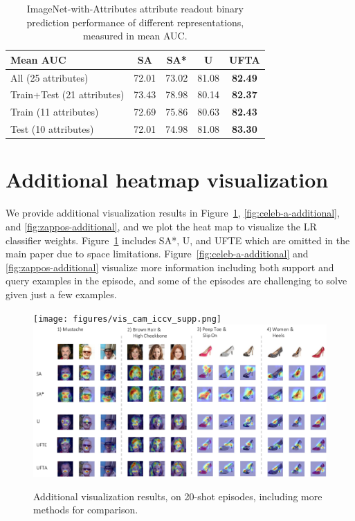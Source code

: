 \begin{table}
\begin{small}
\begin{center}
\begin{tabular}{lcccc}
\toprule
{\bf Mean AUC}             & {\bf SA}  & {\bf SA*}  & {\bf U}   & {\bf UFTA}   \\
\hline

\hline
 All (25 attributes)        & 72.01 & 73.02 & 81.08 & \textbf{82.49} \\
 Train+Test (21 attributes) & 73.43 & 78.98 & 80.14 & \textbf{82.37} \\
 Train (11 attributes)      & 72.69 & 75.86 & 80.63 & \textbf{82.43} \\
 Test (10 attributes)       & 72.01 & 74.98 & 81.08 & \textbf{83.30} \\
\hline
\end{tabular}
\end{center}
\end{small}
\caption{ImageNet-with-Attributes attribute readout binary prediction
performance of different representations, measured in mean AUC. }
\label{tab:attrreadout-imageneta}
\end{table}

\section{Additional heatmap visualization}

We provide additional visualization results in
Figure~\ref{fig:additional_combo}, \ref{fig:celeb-a-additional}, and
\ref{fig:zappos-additional}, and we plot the heat map to visualize the LR
classifier weights. Figure~\ref{fig:additional_combo} includes SA*, U, and UFTE
which are omitted in the main paper due to space limitations.
Figure~\ref{fig:celeb-a-additional} and \ref{fig:zappos-additional} visualize
more information including both support and query examples in the episode, and
some of the episodes are challenging to solve given just a few examples.

\begin{figure}[t]
\centering
\iflatexml
\texttt{[image: figures/vis\_cam\_iccv\_supp.png]}
\else
\includegraphics[width=0.9\linewidth]{figures/vis_cam_iccv_supp.pdf}
\fi
\caption{Additional visualization results, on 20-shot episodes, including more
methods for comparison.}
\label{fig:additional_combo}
\end{figure}


